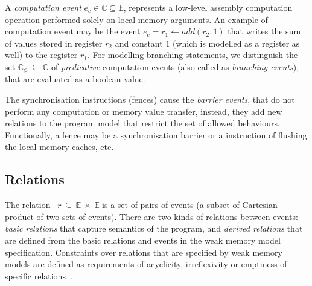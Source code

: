 A \textit{computation event} $e_c \in \mathbb{C} \subseteq \mathbb{E}$, represents a low-level assembly computation operation performed solely on local-memory arguments.
An example of computation event may be the event $e_c = r_1 \leftarrow add(r_2, 1)$ that writes the sum of values stored in register $r_2$ and constant $1$ (which is modelled as a register as well) to the register $r_1$.
For modelling branching statements, we distinguish the set $\mathbb{C_{p}}~\subseteq~\mathbb{C}$ of \textit{predicative} computation events (also called as \textit{branching events}), that are evaluated as a boolean value.

The synchronisation instructions (fences) cause the \textit{barrier events}, that do not perform any computation or memory value transfer, instead, they add new relations to the program model that restrict the set of allowed behaviours.
Functionally, a fence may be a synchronisation barrier or a instruction of flushing the local memory caches, etc.


\subsection{Relations}
\label{ch:wmm:model:relations}


The relation~%
$r\,\subseteq~\mathbb{E}~\times~\mathbb{E}$ is a set of pairs of events (a subset of Cartesian product of two sets of events). There are two kinds of relations between events: \textit{basic relations} %
that capture semantics of the program, and \textit{derived relations} that are defined from the basic relations and events in the weak memory model specification. Constraints over relations that are specified by weak memory models are defined as requirements of acyclicity, irreflexivity or emptiness of specific relations~\cite{alglave2016syntax}.

